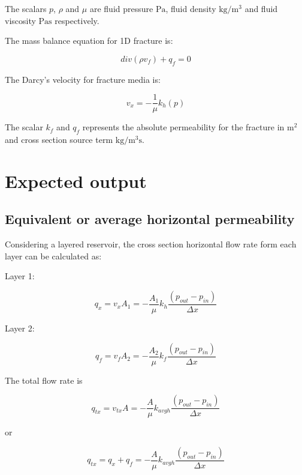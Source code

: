 \documentclass{article}
\begin{document}
The scalars $p$, $\rho$ and $\mu$ are fluid pressure $\si{\pascal}$, fluid density $\si{\kilo\gram\per\cubic\metre}$ and fluid viscosity $\si{\pascal\second}$ respectively.

The mass balance equation for 1D fracture is:

\begin{equation}
div\left(\rho v_{f}\right)+q_{f}=0
\end{equation}

The Darcy's velocity for fracture media is:

\begin{equation}
v_{x}=-\frac{1}{\mu}k_{h}\left(p\right)
\end{equation}

The scalar $k_{f}$ and $q_{f}$ represents the absolute permeability for the fracture in $\si{\square\metre}$ and cross section source term $\si{\kilo\gram\per\cubic\metre\second}$.

\section{Expected output}

\subsection*{Equivalent or average horizontal permeability}


Considering a layered reservoir, the cross section horizontal flow
rate form each layer can be calculated as:

Layer 1:

\begin{equation}
q_{x}=v_{x}A_{1}=-\frac{A_{1}}{\mu}k_{h}\frac{\left(p_{out}-p_{in}\right)}{\Delta x}
\end{equation}

Layer 2:

\begin{equation}
q_{f}=v_{f}A_{2}=-\frac{A_{2}}{\mu}k_{f}\frac{\left(p_{out}-p_{in}\right)}{\Delta x}
\end{equation}

The total flow rate is 

\begin{equation}
q_{tx}=v_{tx}A=-\frac{A}{\mu}k_{avgh}\frac{\left(p_{out}-p_{in}\right)}{\Delta x}
\end{equation}

or

\begin{equation}
q_{tx}=q_{x}+q_{f}=-\frac{A}{\mu}k_{avgh}\frac{\left(p_{out}-p_{in}\right)}{\Delta x}
\end{equation}
\end{document}

